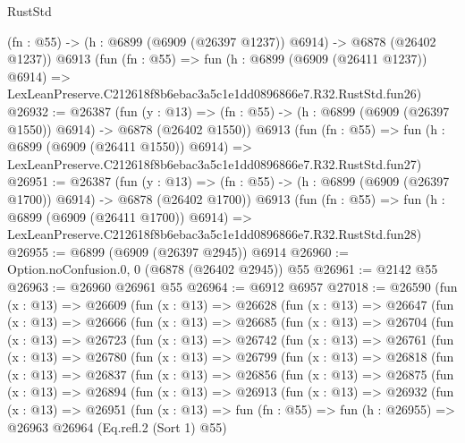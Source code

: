 \begin{lexlean}{RustStd}
\begin{coremodule}
    (fn : @55) -> (h : @6899 (@6909 (@26397 @1237)) @6914) -> @6878 (@26402 @1237))
    @6913
    (fun (fn : @55) =>
    fun (h : @6899 (@6909 (@26411 @1237)) @6914) =>
    LexLeanPreserve.C212618f8b6ebac3a5c1e1dd0896866e7.R32.RustStd.fun26)
@26932 := @26387
    (fun (y : @13) =>
    (fn : @55) -> (h : @6899 (@6909 (@26397 @1550)) @6914) -> @6878 (@26402 @1550))
    @6913
    (fun (fn : @55) =>
    fun (h : @6899 (@6909 (@26411 @1550)) @6914) =>
    LexLeanPreserve.C212618f8b6ebac3a5c1e1dd0896866e7.R32.RustStd.fun27)
@26951 := @26387
    (fun (y : @13) =>
    (fn : @55) -> (h : @6899 (@6909 (@26397 @1700)) @6914) -> @6878 (@26402 @1700))
    @6913
    (fun (fn : @55) =>
    fun (h : @6899 (@6909 (@26411 @1700)) @6914) =>
    LexLeanPreserve.C212618f8b6ebac3a5c1e1dd0896866e7.R32.RustStd.fun28)
@26955 := @6899 (@6909 (@26397 @2945)) @6914
@26960 := Option.noConfusion.{0, 0} (@6878 (@26402 @2945)) @55
@26961 := @2142 @55
@26963 := @26960 @26961 @55
@26964 := @6912 @6957
@27018 := @26590
    (fun (x : @13) =>
    @26609
      (fun (x : @13) =>
      @26628
        (fun (x : @13) =>
        @26647
          (fun (x : @13) =>
          @26666
            (fun (x : @13) =>
            @26685
              (fun (x : @13) =>
              @26704
                (fun (x : @13) =>
                @26723
                  (fun (x : @13) =>
                  @26742
                    (fun (x : @13) =>
                    @26761
                      (fun (x : @13) =>
                      @26780
                        (fun (x : @13) =>
                        @26799
                          (fun (x : @13) =>
                          @26818
                            (fun (x : @13) =>
                            @26837
                              (fun (x : @13) =>
                              @26856
                                (fun (x : @13) =>
                                @26875
                                  (fun (x : @13) =>
                                  @26894
                                    (fun (x : @13) =>
                                    @26913
                                      (fun (x : @13) =>
                                      @26932
                                        (fun (x : @13) =>
                                        @26951
                                          (fun (x : @13) =>
                                          fun (fn : @55) =>
                                          fun (h : @26955) =>
                                          @26963
                                            @26964
                                            (Eq.refl.{2} (Sort 1) @55)

\end{coremodule}
\end{lexlean}
